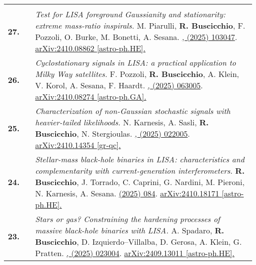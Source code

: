 {\begin{longtable}{rp{0.3cm}p{15.8cm}}
\vspace{0.09cm}\\
%
\textbf{27.} & & \textit{Test for LISA foreground Gaussianity and stationarity: extreme mass-ratio inspirals.}
\newline{}
M. Piarulli, \textbf{R. Buscicchio}, F. Pozzoli, O. Burke, M. Bonetti, A. Sesana.
\newline{}
\href{https://doi.org/10.1103/nfn4-pgr5}{\prd 111, (2025) 103047}. \href{https://arxiv.org/abs/2410.08862}{arXiv:2410.08862 [astro-ph.HE].}
\vspace{0.09cm}\\
%
\textbf{26.} & & \textit{Cyclostationary signals in LISA: a practical application to Milky Way satellites.}
\newline{}
F. Pozzoli, \textbf{R. Buscicchio}, A. Klein, V. Korol, A. Sesana, F. Haardt.
\newline{}
\href{https://doi.org/10.1103/PhysRevD.111.063005}{\prd 111, (2025) 063005}. \href{https://arxiv.org/abs/2410.08274}{arXiv:2410.08274 [astro-ph.GA].}
\vspace{0.09cm}\\
%
\textbf{25.} & & \textit{Characterization of non-Gaussian stochastic signals with heavier-tailed likelihoods.}
\newline{}
N. Karnesis, A. Sasli, \textbf{R. Buscicchio}, N. Stergioulas.
\newline{}
\href{https://doi.org/10.1103/PhysRevD.111.022005}{\prd 111, (2025) 022005}. \href{https://arxiv.org/abs/2410.14354}{arXiv:2410.14354 [gr-qc].}
\vspace{0.09cm}\\
%
\textbf{24.} & & \textit{Stellar-mass black-hole binaries in LISA: characteristics and complementarity with current-generation interferometers.}
\newline{}
\textbf{R. Buscicchio}, J. Torrado, C. Caprini, G. Nardini, M. Pieroni, N. Karnesis, A. Sesana.
\newline{}
\href{https://doi.org/10.1088/1475-7516/2025/01/084}{\jcap 01 (2025) 084}. \href{https://arxiv.org/abs/2410.18171}{arXiv:2410.18171 [astro-ph.HE].}
\vspace{0.09cm}\\
%
\textbf{23.} & & \textit{Stars or gas? Constraining the hardening processes of massive black-hole binaries with LISA.}
\newline{}
A. Spadaro, \textbf{R. Buscicchio}, D. Izquierdo--Villalba, D. Gerosa, A. Klein, G. Pratten.
\newline{}
\href{https://doi.org/10.1103/PhysRevD.111.023004}{\prd 111, (2025) 023004}. \href{https://arxiv.org/abs/2409.13011}{arXiv:2409.13011 [astro-ph.HE].}

\end{longtable}}
